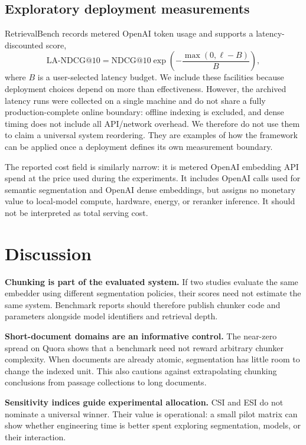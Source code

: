 \documentclass[10pt,letterpaper]{article}
\begin{document}
\subsection{Exploratory deployment measurements}

RetrievalBench records metered OpenAI token usage and supports a latency-discounted score,
\begin{equation}
\mathrm{LA\mbox{-}NDCG}@10 = \mathrm{NDCG}@10
\exp\!\left(-\frac{\max(0,\ell-B)}{B}\right),
\end{equation}
where $B$ is a user-selected latency budget. We include these facilities because deployment choices
depend on more than effectiveness. However, the archived latency runs were collected on a single
machine and do not share a fully production-complete online boundary: offline indexing is excluded,
and dense timing does not include all API/network overhead. We therefore do not use them to claim a
universal system reordering. They are examples of how the framework can be applied once a deployment
defines its own measurement boundary.

The reported cost field is similarly narrow: it is metered OpenAI embedding API spend at the price
used during the experiments. It includes OpenAI calls used for semantic segmentation and OpenAI
dense embeddings, but assigns no monetary value to local-model compute, hardware, energy, or
reranker inference. It should not be interpreted as total serving cost.

\section{Discussion}

\textbf{Chunking is part of the evaluated system.}
If two studies evaluate the same embedder using different segmentation policies, their scores need
not estimate the same system. Benchmark reports should therefore publish chunker code and
parameters alongside model identifiers and retrieval depth.

\textbf{Short-document domains are an informative control.}
The near-zero spread on Quora shows that a benchmark need not reward arbitrary chunker complexity.
When documents are already atomic, segmentation has little room to change the indexed unit. This
also cautions against extrapolating chunking conclusions from passage collections to long documents.

\textbf{Sensitivity indices guide experimental allocation.}
CSI and ESI do not nominate a universal winner. Their value is operational: a small pilot matrix can
show whether engineering time is better spent exploring segmentation, models, or their interaction.
\end{document}
